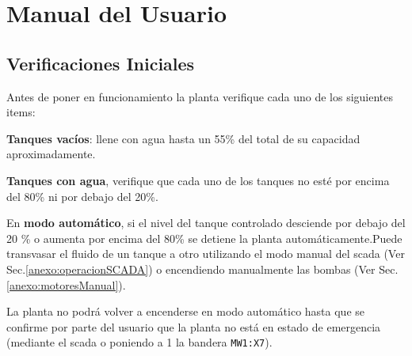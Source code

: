 \chapter{Manual del Usuario}
\label{anexo:manualUsuario}

\section{Verificaciones Iniciales}
\label{anexo:verificaciones}
Antes de poner en funcionamiento la planta verifique cada uno de los siguientes
items:

\begin{tcolorbox}[title=Nivel de agua]
\textbf{Tanques vacíos}: llene con agua hasta un 55\%
del total de su capacidad aproximadamente.

\textbf{Tanques con agua}, verifique que cada uno de los tanques no esté por
encima del 80\% ni por debajo del 20\%.

\end {tcolorbox}
\begin{lattention}
En \textbf{modo automático}, si el nivel del tanque controlado desciende por
debajo del 20 \% o aumenta por encima del 80\% se detiene la planta 
automáticamente.Puede transvasar el fluido de un tanque a otro utilizando el 
modo manual del \gls{scada} (Ver Sec.\ref{anexo:operacionSCADA}) o encendiendo 
manualmente las bombas (Ver Sec.\ref{anexo:motoresManual}).

La planta no podrá volver a encenderse en modo automático hasta que se confirme
por parte del usuario que la planta no está en estado de emergencia (mediante el
\gls{scada} o poniendo a 1 la bandera \verb|MW1:X7|).
\end{lattention}

